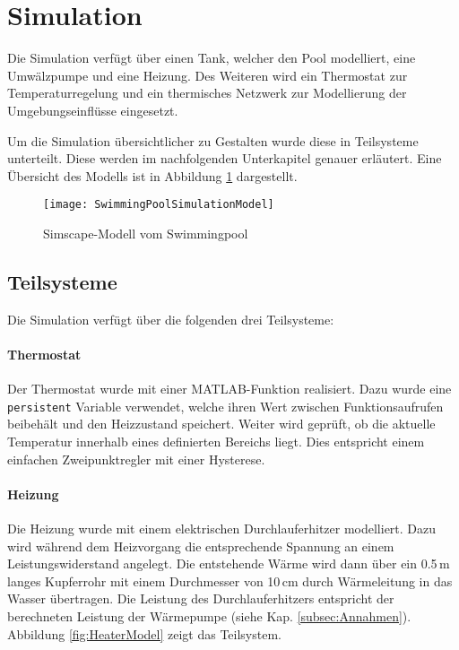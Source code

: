 \section{Simulation}
\label{sec:Simulation}
Die Simulation verfügt über einen Tank, welcher den Pool modelliert, eine Umwälzpumpe und eine Heizung. Des Weiteren wird ein Thermostat zur Temperaturregelung und ein thermisches Netzwerk zur Modellierung der Umgebungseinflüsse eingesetzt.

Um die Simulation übersichtlicher zu Gestalten wurde diese in Teilsysteme unterteilt. Diese werden im nachfolgenden Unterkapitel genauer erläutert. Eine Übersicht des Modells ist in Abbildung \ref{fig:SwimmingPoolSimulationModel} dargestellt.

\vspace{0.5cm}
\begin{figure}[H]
	\centering
	\texttt{[image: SwimmingPoolSimulationModel]}
	\caption{Simscape-Modell vom Swimmingpool}
	\label{fig:SwimmingPoolSimulationModel}
\end{figure}

\vspace{0.5cm}
\subsection{Teilsysteme}
\label{subsec:Teilsysteme}
Die Simulation verfügt über die folgenden drei Teilsysteme:

\vspace{0.5cm}
\paragraph{Thermostat}
Der Thermostat wurde mit einer MATLAB-Funktion realisiert. Dazu wurde eine \texttt{persistent} Variable verwendet, welche ihren Wert zwischen Funktionsaufrufen beibehält und den Heizzustand speichert. Weiter wird geprüft, ob die aktuelle Temperatur innerhalb eines definierten Bereichs liegt. Dies entspricht einem einfachen Zweipunktregler mit einer Hysterese.

\vspace{0.5cm}
\paragraph{Heizung}
Die Heizung wurde mit einem elektrischen Durchlauferhitzer modelliert. Dazu wird während dem Heizvorgang die entsprechende Spannung an einem Leistungswiderstand angelegt. Die entstehende Wärme wird dann über ein 0.5\,m langes Kupferrohr mit einem Durchmesser von 10\,cm durch Wärmeleitung in das Wasser übertragen. Die Leistung des Durchlauferhitzers entspricht der berechneten Leistung der Wärmepumpe (siehe Kap. \ref{subsec:Annahmen}). Abbildung \ref{fig:HeaterModel} zeigt das Teilsystem.

